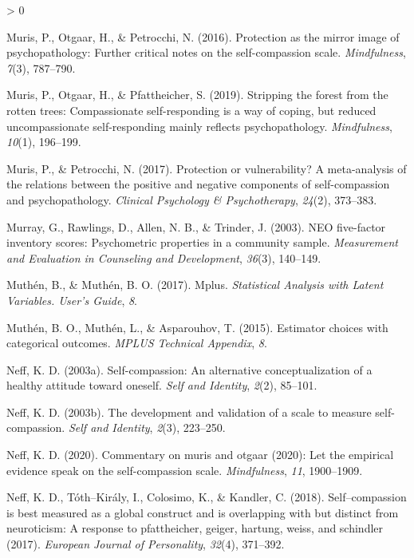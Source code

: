 \documentclass[
  english,
  man,floatsintext]{apa7}
\newlength{\cslhangindent}
\newenvironment{CSLReferences}[2] %
 {%
  \setlength{\parindent}{0pt}
  \ifodd #1 \everypar{\setlength{\hangindent}{\cslhangindent}}\ignorespaces\fi
  \ifnum #2 > 0
  \setlength{\parskip}{#2\baselineskip}
  \fi
 }%
 {}
\begin{document}
\begin{CSLReferences}{1}{0}
\leavevmode\hypertarget{ref-muris2016protection}{}%
Muris, P., Otgaar, H., \& Petrocchi, N. (2016). Protection as the mirror image of psychopathology: Further critical notes on the self-compassion scale. \emph{Mindfulness}, \emph{7}(3), 787--790.

\leavevmode\hypertarget{ref-muris2019stripping}{}%
Muris, P., Otgaar, H., \& Pfattheicher, S. (2019). Stripping the forest from the rotten trees: Compassionate self-responding is a way of coping, but reduced uncompassionate self-responding mainly reflects psychopathology. \emph{Mindfulness}, \emph{10}(1), 196--199.

\leavevmode\hypertarget{ref-muris2017protection}{}%
Muris, P., \& Petrocchi, N. (2017). Protection or vulnerability? A meta-analysis of the relations between the positive and negative components of self-compassion and psychopathology. \emph{Clinical Psychology \& Psychotherapy}, \emph{24}(2), 373--383.

\leavevmode\hypertarget{ref-murray2003neo}{}%
Murray, G., Rawlings, D., Allen, N. B., \& Trinder, J. (2003). NEO five-factor inventory scores: Psychometric properties in a community sample. \emph{Measurement and Evaluation in Counseling and Development}, \emph{36}(3), 140--149.

\leavevmode\hypertarget{ref-muthen2017mplus}{}%
Muthén, B., \& Muthén, B. O. (2017). Mplus. \emph{Statistical Analysis with Latent Variables. User's Guide}, \emph{8}.

\leavevmode\hypertarget{ref-muthen2015estimator}{}%
Muthén, B. O., Muthén, L., \& Asparouhov, T. (2015). Estimator choices with categorical outcomes. \emph{MPLUS Technical Appendix}, \emph{8}.

\leavevmode\hypertarget{ref-neff2003self}{}%
Neff, K. D. (2003a). Self-compassion: An alternative conceptualization of a healthy attitude toward oneself. \emph{Self and Identity}, \emph{2}(2), 85--101.

\leavevmode\hypertarget{ref-neff2003development}{}%
Neff, K. D. (2003b). The development and validation of a scale to measure self-compassion. \emph{Self and Identity}, \emph{2}(3), 223--250.

\leavevmode\hypertarget{ref-neff2020commentary}{}%
Neff, K. D. (2020). Commentary on muris and otgaar (2020): Let the empirical evidence speak on the self-compassion scale. \emph{Mindfulness}, \emph{11}, 1900--1909.

\leavevmode\hypertarget{ref-neff2018self}{}%
Neff, K. D., Tóth--Király, I., Colosimo, K., \& Kandler, C. (2018). Self--compassion is best measured as a global construct and is overlapping with but distinct from neuroticism: A response to pfattheicher, geiger, hartung, weiss, and schindler (2017). \emph{European Journal of Personality}, \emph{32}(4), 371--392.


\end{CSLReferences}
\end{document}
